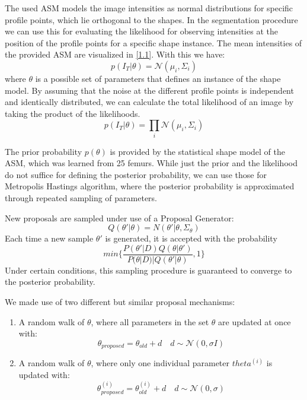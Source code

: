 \documentclass{article}
\begin{document}
	The used ASM models the image intensities as normal distributions for specific profile points, which lie orthogonal to the shapes.
	In the segmentation procedure we can use this for evaluating the likelihood for observing intensities at the position of the profile points for a specific shape instance.
	The mean intensities of the provided ASM are visualized in \autoref{1.1}.
	With this we have:
	\begin{equation}
	p(I_T | \theta) = \mathcal{N}(\mu_i, \Sigma_i) 
	\end{equation}
	where $\theta$ is a possible set of parameters that defines an instance of the shape model.
	By assuming that the noise at the different profile points is independent and identically distributed, we can calculate the total likelihood of an image by taking the product of the likelihoods.	
	\begin{equation}
	p(I_T|\theta) = \prod_{i} \mathcal{N}(\mu_i, \Sigma_i)
	\end{equation}
	
	The prior probability $p(\theta)$ is provided by the statistical shape model of the ASM, which was learned from 25 femurs.
	While just the prior and the likelihood do not suffice for defining the posterior probability, we can use those for Metropolis Hastings algorithm, where the posterior probability is approximated through repeated sampling of parameters.
	
	New proposals are sampled under use of a Proposal Generator:
	\begin{equation}
	Q(\theta' | \theta) = N(\theta'|\theta, \Sigma_\theta)
	\end{equation}
	Each time a new sample $\theta'$ is generated, it is accepted with the probability 
	\begin{equation}
	min \{ \frac{P(\theta' | D ) Q(\theta|\theta')}{P(\theta|D) | Q(\theta'|\theta)}, 1\}
	\end{equation}
	Under certain conditions, this sampling procedure is guaranteed to converge to the posterior probability.
	
	We made use of two different but similar proposal mechanisms:
	\begin{enumerate}
		\item A random walk of $\theta$, where all parameters in the set $\theta$ are updated at once with: 
		$$\theta_{proposed} = \theta_{old} + d \quad d \sim \mathcal{N}(0,\sigma I)$$
		\item A random walk of $\theta$, where only one individual parameter $theta^(i)$ is updated with: 
		$$\theta_{proposed}^{(i)} = \theta_{old}^{(i)} + d \quad d \sim \mathcal{N}(0,\sigma)$$
	\end{enumerate}
	
\end{document}
